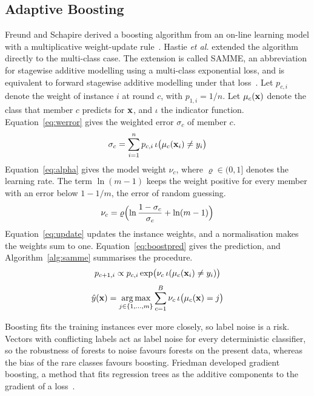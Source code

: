 \documentclass[10pt,conference]{IEEEtran}
\begin{document}
\subsection{Adaptive Boosting}
\label{sec:bg-boosting}

Freund and Schapire derived a boosting algorithm from an on-line learning model with a multiplicative weight-update rule~\cite{freund1997}. Hastie \textit{et al.} extended the algorithm directly to the multi-class case. The extension is called SAMME, an abbreviation for stagewise additive modelling using a multi-class exponential loss, and is equivalent to forward stagewise additive modelling under that loss~\cite{hastie2009}. Let $p_{c,i}$ denote the weight of instance $i$ at round $c$, with $p_{1,i} = 1/n$. Let $\mu_c(\mathbf{x})$ denote the class that member $c$ predicts for $\mathbf{x}$, and $\iota$ the indicator function. Equation~\eqref{eq:werror} gives the weighted error $\sigma_c$ of member $c$.
\begin{equation}
\label{eq:werror}
\sigma_c = \sum_{i=1}^{n} p_{c,i} \, \iota\bigl(\mu_c(\mathbf{x}_i) \neq y_i\bigr)
\end{equation}
Equation~\eqref{eq:alpha} gives the model weight $\nu_c$, where $\varrho \in (0, 1]$ denotes the learning rate. The term $\ln(m - 1)$ keeps the weight positive for every member with an error below $1 - 1/m$, the error of random guessing.
\begin{equation}
\label{eq:alpha}
\nu_c = \varrho \Bigl( \ln \frac{1 - \sigma_c}{\sigma_c} + \ln (m - 1) \Bigr)
\end{equation}
Equation~\eqref{eq:update} updates the instance weights, and a normalisation makes the weights sum to one. Equation~\eqref{eq:boostpred} gives the prediction, and Algorithm~\ref{alg:samme} summarises the procedure.
\begin{equation}
\label{eq:update}
p_{c+1,i} \propto p_{c,i} \exp\bigl( \nu_c \, \iota(\mu_c(\mathbf{x}_i) \neq y_i) \bigr)
\end{equation}
\begin{equation}
\label{eq:boostpred}
\hat{y}(\mathbf{x}) = \operatorname*{arg\,max}_{j \in \{1, \ldots, m\}} \sum_{c=1}^{B} \nu_c \, \iota\bigl(\mu_c(\mathbf{x}) = j\bigr)
\end{equation}

Boosting fits the training instances ever more closely, so label noise is a risk. Vectors with conflicting labels act as label noise for every deterministic classifier, so the robustness of forests to noise favours forests on the present data, whereas the bias of the rare classes favours boosting. Friedman developed gradient boosting, a method that fits regression trees as the additive components to the gradient of a loss~\cite{friedman2001}.
\end{document}
